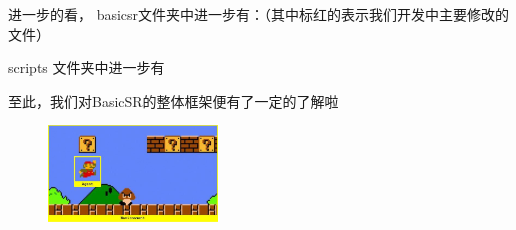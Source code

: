 \documentclass[../main.tex]{subfiles}
\begin{document}
进一步的看，
basicsr文件夹中进一步有：（其中标红的表示我们开发中主要修改的文件）


scripts 文件夹中进一步有

至此，我们对BasicSR的整体框架便有了一定的了解啦~




\begin{figure}
\centering
\includegraphics[width=0.4\textwidth]{figures/agentenv.png}
\end{figure}
\end{document}
